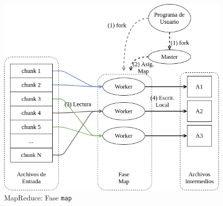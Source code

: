 \begin{figure}[h!]
  \centering
  \includegraphics[width=0.75\linewidth]{figuras/MapReduce_mapper_phase.png}
  \caption{MapReduce: Fase {\tt map}}
  \label{fig:mapreduce_mapper_phase}
\end{figure}

